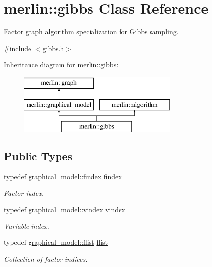 \hypertarget{classmerlin_1_1gibbs}{}\section{merlin\+:\+:gibbs Class Reference}
\label{classmerlin_1_1gibbs}


Factor graph algorithm specialization for Gibbs sampling.  




{\ttfamily \#include $<$gibbs.\+h$>$}

Inheritance diagram for merlin\+:\+:gibbs\+:\begin{figure}[H]
\begin{center}
\leavevmode
\includegraphics[height=3.000000cm]{classmerlin_1_1gibbs}
\end{center}
\end{figure}
\subsection*{Public Types}
\begin{DoxyCompactItemize}
\item 
typedef \hyperlink{classmerlin_1_1graphical__model_ab2b46f09d8142bb68f243ecadbdabb6b}{graphical\+\_\+model\+::findex} \hyperlink{classmerlin_1_1gibbs_a19c11865cd36a9920aec11f902958b93}{findex}\hypertarget{classmerlin_1_1gibbs_a19c11865cd36a9920aec11f902958b93}{}\label{classmerlin_1_1gibbs_a19c11865cd36a9920aec11f902958b93}

\begin{DoxyCompactList}\small\item\em Factor index. \end{DoxyCompactList}\item 
typedef \hyperlink{classmerlin_1_1graphical__model_a275006a490bc09239c12a4d93d53b135}{graphical\+\_\+model\+::vindex} \hyperlink{classmerlin_1_1gibbs_a6bfd73700f9e6917f89ea5c7894c7a5d}{vindex}\hypertarget{classmerlin_1_1gibbs_a6bfd73700f9e6917f89ea5c7894c7a5d}{}\label{classmerlin_1_1gibbs_a6bfd73700f9e6917f89ea5c7894c7a5d}

\begin{DoxyCompactList}\small\item\em Variable index. \end{DoxyCompactList}\item 
typedef \hyperlink{classmerlin_1_1graphical__model_a615e25ec6594615fddfd4c3c4776b99f}{graphical\+\_\+model\+::flist} \hyperlink{classmerlin_1_1gibbs_ae98b71f43cbaadae19535d4728225c06}{flist}\hypertarget{classmerlin_1_1gibbs_ae98b71f43cbaadae19535d4728225c06}{}\label{classmerlin_1_1gibbs_ae98b71f43cbaadae19535d4728225c06}

\begin{DoxyCompactList}\small\item\em Collection of factor indices. \end{DoxyCompactList}\end{DoxyCompactItemize}
